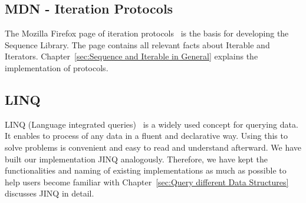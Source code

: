 \subsection{MDN - Iteration Protocols}
\label{sub:MDN - Iteration Protocols}
The Mozilla Firefox page of iteration protocols~\cite{mdn_protocols} is the basis for developing the
Sequence Library. The page contains all relevant facts about Iterable and
Iterators. Chapter~\ref{sec:Sequence and Iterable in General} explains the
implementation of protocols.

\subsection{LINQ}
\label{sub:LINQ}
LINQ (Language integrated queries)~\cite{billwagner_language-integrated_2023} 
is a widely used concept for querying data. It enables to process of any data
in a fluent and declarative way. Using this to solve problems is convenient and
easy to read and understand afterward.
We have built our implementation JINQ analogously. Therefore,
we have kept the functionalities and naming of existing implementations as much 
as possible to help users become familiar with 
Chapter~\ref{sec:Query different Data Structures} discusses JINQ in detail.
